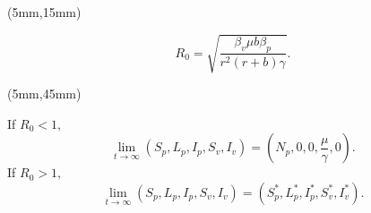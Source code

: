 	\begin{frame}
	
			\begin{textblock*}{50mm}(5mm,15mm)	
				\only<1,2,3>
				{
				\begin{greenbox}{}
					\begin{equation*}
					R_0=\sqrt{\frac{\beta_v\mu b\beta_p}{r^2(r+b)\gamma}}.
					\end{equation*}
				\end{greenbox}
				}		
			\begin{textblock*}{70mm}(5mm,45mm)
				\begin{yellowbox}{}
				\only<2>
				{	
					If $R_0<1,$
					\begin{equation*}
					\lim\limits_{t\rightarrow \infty}(S_p,L_p,I_p,S_v,I_v)=(N_p,0,0,\frac{\mu}{\gamma},0).
					\end{equation*}
				}
				\only<3>
				{
					If $R_0>1,$
					\begin{equation*}
						\lim\limits_{t\rightarrow \infty}(S_p,L_p,I_p,S_v,I_v)=(S_p^*,L_p^*,I_p^*,S_v^*,I_v^*).
					\end{equation*}
				}
				\end{yellowbox}
			\end{textblock*}
			

\end{textblock*}
\end{frame}
